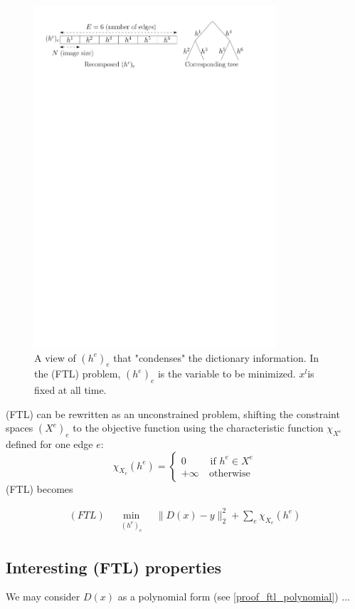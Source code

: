 \begin{figure}[!ht] \centering
\includegraphics[width=0.8\textwidth]{figures/hk_tree.pdf}
\caption{A view of $(h^e)_e$ that "condenses" the dictionary information. In the (FTL) problem, $(h^e)_e$ is the variable to be minimized. $x^l$is fixed at all time.}\label{fig_hk_tree}
\end{figure}

(FTL) can be rewritten as an unconstrained problem, shifting the constraint spaces $(X^e)_e$ to the objective function using the characteristic function $\chi_{X^e}$defined for one edge $e$:
$$\chi_{X_e}(h^e) = \begin{cases} 0 &\text{ if } h^e \in X^e \\ +\infty & \ \text{otherwise}\end{cases}$$
(FTL) becomes

\begin{align}
(FTL) \quad \underset{\substack{(h^\text{e})_{e}}}\min & \lVert D(x) - y \rVert_2^2 + \sum_{e}\chi_{X_e} (h^e)
\end{align}

\subsection{Interesting (FTL) properties}
We may consider $D(x)$ as a polynomial form (see \ref{proof_ftl_polynomial}) ...

